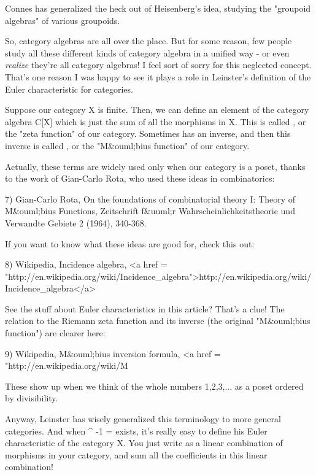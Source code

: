 Connes has generalized the heck out of Heisenberg's idea, studying
the "groupoid algebras" of various groupoids.

So, category algebras are all over the place.  But for some reason,
few people study all these different kinds of category algebra in a
unified way - or even \emph{realize} they're all category algebras!
I feel sort of sorry for this neglected concept.  That's one reason I
was happy to see it plays a role in Leinster's definition of the Euler
characteristic for categories.

Suppose our category X is finite.  Then, we can define an element of
the category algebra C[X] which is just the sum of all the morphisms
in X.  This is called \zeta , or the "zeta function" of our
category.  Sometimes \zeta  has an inverse, and then this inverse is
called \mu , or the "M&ouml;bius function" of our category.

Actually, these terms are widely used only when our category is a 
poset, thanks to the work of Gian-Carlo Rota, who used these ideas 
in combinatorics:

7) Gian-Carlo Rota, On the foundations of combinatorial theory I:
Theory of M&ouml;bius Functions, Zeitschrift f&uuml;r
Wahrscheinlichkeitstheorie und Verwandte Gebiete 2 (1964), 340-368.

If you want to know what these ideas are good for, check this out:

8) Wikipedia, Incidence algebra, 
<a href = "http://en.wikipedia.org/wiki/Incidence_algebra">http://en.wikipedia.org/wiki/Incidence_algebra</a>

See the stuff about Euler characteristics in this article?  That's a 
clue!  The relation to the Riemann zeta function and its inverse
(the original "M&ouml;bius function") are clearer here:

9) Wikipedia, M&ouml;bius inversion formula,
<a href = "http://en.wikipedia.org/wiki/M%

These show up when we think of the whole numbers 1,2,3,... as a poset 
ordered by divisibility.

Anyway, Leinster has wisely generalized this terminology to more
general categories.  And when \zeta ^{ -1} = \mu  exists, it's
really easy to define his Euler characteristic of the category X.  You
just write \mu  as a linear combination of morphisms in your category,
and sum all the coefficients in this linear combination!

